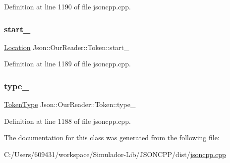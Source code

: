 Definition at line 1190 of file jsoncpp.\+cpp.

\hypertarget{class_json_1_1_our_reader_1_1_token_aedf68bb00eaaa9d3c22b9825999602ac}{}\label{class_json_1_1_our_reader_1_1_token_aedf68bb00eaaa9d3c22b9825999602ac} 
\subsubsection{\texorpdfstring{start\+\_\+}{start\_}}
{\footnotesize\ttfamily \hyperlink{class_json_1_1_our_reader_a1bdc7bbc52ba87cae6b19746f2ee0189}{Location} Json\+::\+Our\+Reader\+::\+Token\+::start\+\_\+}



Definition at line 1189 of file jsoncpp.\+cpp.

\hypertarget{class_json_1_1_our_reader_1_1_token_abe7d858530396fa7e1293f7a579880ed}{}\label{class_json_1_1_our_reader_1_1_token_abe7d858530396fa7e1293f7a579880ed} 
\subsubsection{\texorpdfstring{type\+\_\+}{type\_}}
{\footnotesize\ttfamily \hyperlink{class_json_1_1_our_reader_a15116f7276ddf1e7a2cc3cbefa884dcc}{Token\+Type} Json\+::\+Our\+Reader\+::\+Token\+::type\+\_\+}



Definition at line 1188 of file jsoncpp.\+cpp.



The documentation for this class was generated from the following file\+:\begin{DoxyCompactItemize}
\item 
C\+:/\+Users/609431/workspace/\+Simulador-\/\+Lib/\+J\+S\+O\+N\+C\+P\+P/dist/\hyperlink{jsoncpp_8cpp}{jsoncpp.\+cpp}\end{DoxyCompactItemize}
